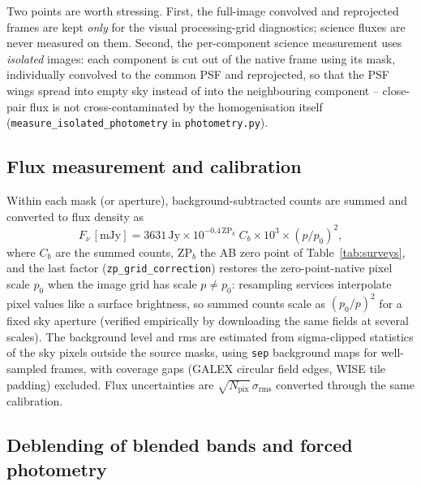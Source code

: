 \documentclass{aa}
\begin{document}
Two points are worth stressing. First, the full-image convolved and
reprojected frames are kept \emph{only} for the visual processing-grid
diagnostics; science fluxes are never measured on them. Second, the
per-component science measurement uses \emph{isolated} images: each
component is cut out of the native frame using its mask, individually
convolved to the common PSF and reprojected, so that the PSF wings spread
into empty sky instead of into the neighbouring component -- close-pair
flux is not cross-contaminated by the homogenisation itself
(\texttt{measure\_isolated\_photometry} in \texttt{photometry.py}).

\subsection{Flux measurement and calibration}
\label{sec:calib}

Within each mask (or aperture), background-subtracted counts are summed
and converted to flux density as
\begin{equation}
F_\nu\,[\mathrm{mJy}] = 3631\,\mathrm{Jy}\times
10^{-0.4\,\mathrm{ZP}_b}\; C_b \times 10^{3} \times
\left(p/p_0\right)^{2},
\label{eq:counts}
\end{equation}
where $C_b$ are the summed counts, $\mathrm{ZP}_b$ the AB zero point of
Table~\ref{tab:surveys}, and the last factor
(\texttt{zp\_grid\_correction}) restores the zero-point-native pixel
scale $p_0$ when the image grid has scale $p \neq p_0$: resampling
services interpolate pixel values like a surface brightness, so summed
counts scale as $(p_0/p)^2$ for a fixed sky aperture (verified
empirically by downloading the same fields at several scales). The
background level and rms are estimated from sigma-clipped statistics of
the sky pixels outside the source masks, using \texttt{sep}
\citep{barbary2016} background maps for well-sampled frames, with
coverage gaps (GALEX circular field edges, WISE tile padding) excluded.
Flux uncertainties are $\sqrt{N_\mathrm{pix}}\,\sigma_\mathrm{rms}$
converted through the same calibration.

\subsection{Deblending of blended bands and forced photometry}
\label{sec:deblend_phot}
\end{document}
